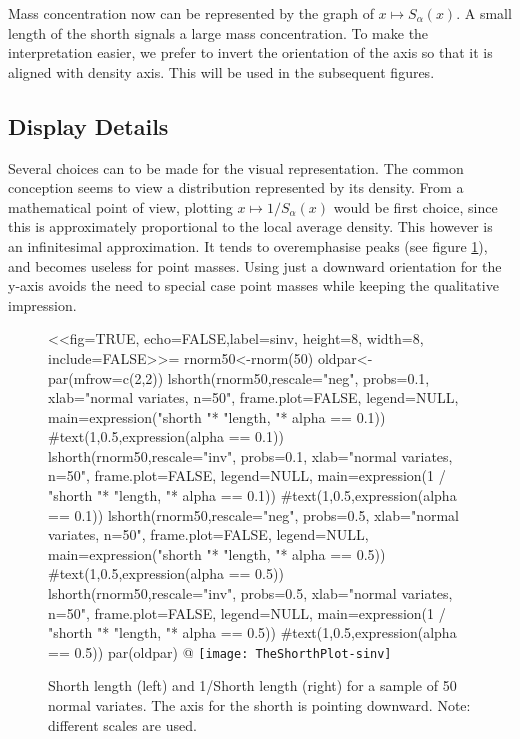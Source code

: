 \documentclass[dvips,12pt,a4paper,twoside]{amsart}
\begin{document}
Mass concentration now can be represented by the graph of $x \mapsto S_\alpha(x)$. A
small length of the shorth signals a large mass concentration. To make the interpretation easier, we 
prefer to invert the orientation of the axis so that it is aligned with density axis. This will be used in the subsequent figures.


\subsection{Display Details}
%
Several choices can to be made for the visual representation. 
The common conception seems to view a distribution represented by its density. From a mathematical 
point of view, plotting $x \mapsto 1/S_{\alpha}(x)$ would be first choice, since this is approximately 
proportional to the local average density.  This however is an infinitesimal approximation. It tends to overemphasise peaks (see figure \ref{fig:sinv}), and becomes useless for point masses. Using just a downward orientation for the y-axis 
avoids the need to special case point masses while keeping the qualitative impression.
\begin{figure}[htb]
<<fig=TRUE, echo=FALSE,label=sinv, height=8, width=8, include=FALSE>>=
rnorm50<-rnorm(50)
oldpar<-par(mfrow=c(2,2))
lshorth(rnorm50,rescale="neg", probs=0.1, xlab="normal variates, n=50", frame.plot=FALSE, legend=NULL, main=expression("shorth "* "length, "* alpha == 0.1))
#text(1,0.5,expression(alpha == 0.1))
lshorth(rnorm50,rescale="inv",  probs=0.1, xlab="normal variates, n=50", frame.plot=FALSE, legend=NULL, main=expression(1 / "shorth "* "length, "* alpha == 0.1))
#text(1,0.5,expression(alpha == 0.1))
lshorth(rnorm50,rescale="neg", probs=0.5, xlab="normal variates, n=50", frame.plot=FALSE, legend=NULL, main=expression("shorth "* "length, "* alpha == 0.5))
#text(1,0.5,expression(alpha == 0.5))
lshorth(rnorm50,rescale="inv",  probs=0.5, xlab="normal variates, n=50", frame.plot=FALSE, legend=NULL, main=expression(1 / "shorth "* "length, "* alpha == 0.5))
#text(1,0.5,expression(alpha == 0.5))
par(oldpar)
@
\texttt{[image: TheShorthPlot-sinv]}
\caption{Shorth length (left) and 1/Shorth length (right) for a sample of 50 normal variates. The axis for the shorth is pointing downward. Note: different scales are used.}
\label{fig:sinv}
\end{figure}
%
\end{document}
